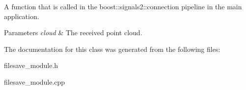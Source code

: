 A function that is called in the boost\-::signals2\-::connection pipeline in the main application. 


\begin{DoxyParams}{Parameters}
{\em cloud} & The received point cloud. \\
\hline
\end{DoxyParams}


The documentation for this class was generated from the following files\-:\begin{DoxyCompactItemize}
\item 
filesave\-\_\-module.\-h\item 
filesave\-\_\-module.\-cpp\end{DoxyCompactItemize}
